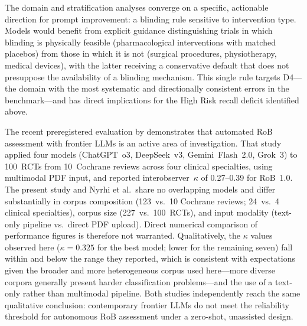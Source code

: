 \documentclass[../main.tex]{subfiles}
\begin{document}
The domain and stratification analyses converge on a specific, actionable
direction for prompt improvement: a blinding rule sensitive to intervention
type.
Models would benefit from explicit guidance distinguishing trials in which
blinding is physically feasible (pharmacological interventions with matched
placebos) from those in which it is not (surgical procedures, physiotherapy,
medical devices), with the latter receiving a conservative default that does
not presuppose the availability of a blinding mechanism.
This single rule targets D4---the domain with the most systematic and
directionally consistent errors in the benchmark---and has direct implications
for the High Risk recall deficit identified above.

The recent preregistered evaluation by \citet{Nyrhi2026} demonstrates that
automated RoB assessment with frontier LLMs is an active area of investigation.
That study applied four models (ChatGPT~o3, DeepSeek~v3, Gemini~Flash~2.0,
Grok~3) to 100~RCTs from 10~Cochrane reviews across four clinical specialties,
using multimodal PDF input, and reported interobserver~$\kappa$ of 0.27--0.39
for RoB~1.0.
The present study and Nyrhi et al.\ share no overlapping models and differ
substantially in corpus composition (123~vs.\ 10 Cochrane reviews;
24~vs.\ 4 clinical specialties), corpus size (227~vs.\ 100~RCTs), and input
modality (text-only pipeline vs.\ direct PDF upload).
Direct numerical comparison of performance figures is therefore not warranted.
Qualitatively, the $\kappa$ values observed here ($\kappa = 0.325$ for the best
model; lower for the remaining seven) fall within and below the range
they reported, which is consistent with expectations given the broader and more
heterogeneous corpus used here---more diverse corpora generally present harder
classification problems---and the use of a text-only rather than multimodal
pipeline.
Both studies independently reach the same qualitative conclusion: contemporary
frontier LLMs do not meet the reliability threshold for autonomous RoB
assessment under a zero-shot, unassisted design.
\end{document}
